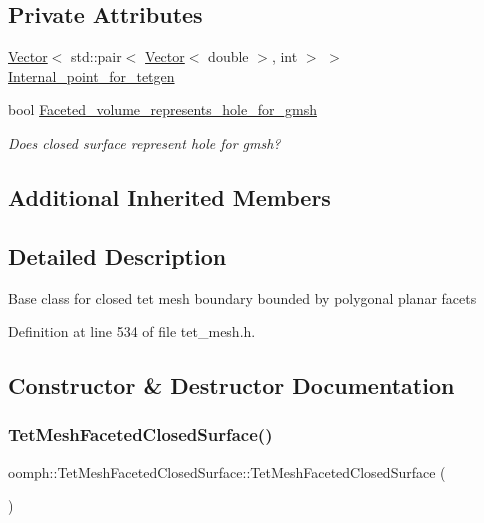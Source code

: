 \subsection*{Private Attributes}
\begin{DoxyCompactItemize}
\item 
\hyperlink{classoomph_1_1Vector}{Vector}$<$ std\+::pair$<$ \hyperlink{classoomph_1_1Vector}{Vector}$<$ double $>$, int $>$ $>$ \hyperlink{classoomph_1_1TetMeshFacetedClosedSurface_afa2b836eca70e66c33223c0b46761dc5}{Internal\+\_\+point\+\_\+for\+\_\+tetgen}
\item 
bool \hyperlink{classoomph_1_1TetMeshFacetedClosedSurface_a375602f98fb808d3f733f651f314fe9b}{Faceted\+\_\+volume\+\_\+represents\+\_\+hole\+\_\+for\+\_\+gmsh}
\begin{DoxyCompactList}\small\item\em Does closed surface represent hole for gmsh? \end{DoxyCompactList}\end{DoxyCompactItemize}
\subsection*{Additional Inherited Members}


\subsection{Detailed Description}
Base class for closed tet mesh boundary bounded by polygonal planar facets 

Definition at line 534 of file tet\+\_\+mesh.\+h.



\subsection{Constructor \& Destructor Documentation}
\mbox{\label{classoomph_1_1TetMeshFacetedClosedSurface_a03485a256274531a3391fb0f86fa34ca}} 
\subsubsection{\texorpdfstring{Tet\+Mesh\+Faceted\+Closed\+Surface()}{TetMeshFacetedClosedSurface()}}
{\footnotesize\ttfamily oomph\+::\+Tet\+Mesh\+Faceted\+Closed\+Surface\+::\+Tet\+Mesh\+Faceted\+Closed\+Surface (\begin{DoxyParamCaption}{ }\end{DoxyParamCaption})\hspace{0.3cm}{\ttfamily [inline]}}



